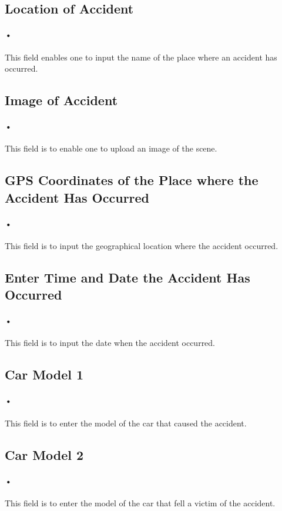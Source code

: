\documentclass[12pt]{article}
\begin{document}
\subsection{Location of Accident}
\paragraph{•}
This field enables one to input the name of the place where an accident has occurred.
\subsection{Image of Accident}
\paragraph{•}
This field is to enable one to upload an image of the scene.
\subsection{GPS Coordinates of the Place where the Accident Has Occurred}
\paragraph{•}
This field is to input the geographical location where the accident occurred.
\subsection{Enter Time and Date the Accident Has Occurred}
\paragraph{•}
This field is to input the date when the accident occurred.
\subsection{Car Model 1}
\paragraph{•}
This field is to enter the model of the car that caused the accident.
\subsection{Car Model 2}
\paragraph{•}
This field is to enter the model of the car that fell a victim of the accident.
\end{document}
